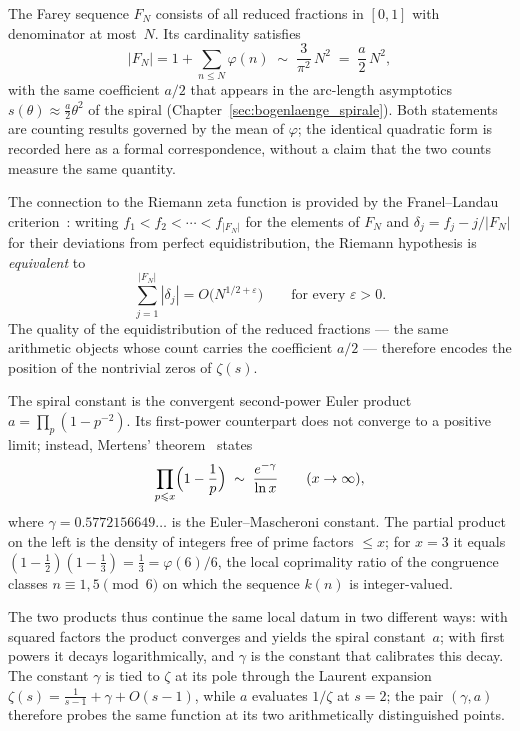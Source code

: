 \begin{remark}
\label{rem:farey_franel}
The Farey sequence $F_N$ consists of all reduced fractions in $[0,1]$
with denominator at most~$N$. Its cardinality satisfies
\begin{equation}\label{eq:farey_count}
  |F_N| = 1 + \sum_{n \leqslant N} \varphi(n)
        \;\sim\; \frac{3}{\pi^2}\,N^2
        \;=\; \frac{a}{2}\,N^2 ,
\end{equation}
with the same coefficient $a/2$ that appears in the arc-length
asymptotics $s(\theta) \approx \tfrac{a}{2}\theta^2$ of the spiral
(Chapter~\ref{sec:bogenlaenge_spirale}). Both statements are counting
results governed by the mean of $\varphi$; the identical quadratic
form is recorded here as a formal correspondence, without a claim
that the two counts measure the same quantity.

The connection to the Riemann zeta function is provided by the
Franel--Landau criterion~\cite{Franel1924, Landau1924}: writing
$f_1 < f_2 < \cdots < f_{|F_N|}$ for the elements of $F_N$ and
$\delta_j = f_j - j/|F_N|$ for their deviations from perfect
equidistribution, the Riemann hypothesis is \emph{equivalent} to
\begin{equation}
  \sum_{j=1}^{|F_N|} |\delta_j| = O\bigl(N^{1/2+\varepsilon}\bigr)
  \qquad \text{for every } \varepsilon > 0.
\end{equation}
The quality of the equidistribution of the reduced fractions --- the
same arithmetic objects whose count carries the coefficient $a/2$ ---
therefore encodes the position of the nontrivial zeros of
$\zeta(s)$.
\end{remark}

\begin{remark}
\label{rem:mertens_gamma}
The spiral constant is the convergent second-power Euler product
$a = \prod_p (1 - p^{-2})$. Its first-power counterpart does not
converge to a positive limit; instead, Mertens'
theorem~\cite{Mertens1874} states
\begin{equation}\label{eq:mertens}
  \prod_{p \leqslant x} \Bigl(1 - \frac{1}{p}\Bigr)
  \;\sim\; \frac{e^{-\gamma}}{\ln x}
  \qquad (x \to \infty),
\end{equation}
where $\gamma = 0.5772156649\ldots$ is the Euler--Mascheroni constant.
The partial product on the left is the density of integers free of
prime factors $\leqslant x$; for $x = 3$ it equals
$(1-\tfrac12)(1-\tfrac13) = \tfrac13 = \varphi(6)/6$, the local
coprimality ratio of the congruence classes $n \equiv 1,5 \pmod 6$ on
which the sequence $k(n)$ is integer-valued.

The two products thus continue the same local datum in two different
ways: with squared factors the product converges and yields the spiral
constant~$a$; with first powers it decays logarithmically, and
$\gamma$ is the constant that calibrates this decay. The constant
$\gamma$ is tied to $\zeta$ at its pole through the Laurent expansion
$\zeta(s) = \frac{1}{s-1} + \gamma + O(s-1)$, while $a$ evaluates
$1/\zeta$ at $s = 2$; the pair $(\gamma, a)$ therefore probes the same
function at its two arithmetically distinguished points.
\end{remark}


